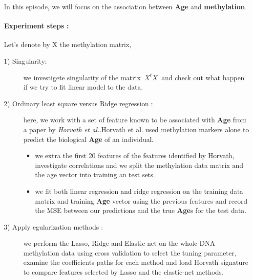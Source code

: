 \documentclass[12pt]{report}
\begin{document}
In this episode, we will focus on the association between \textbf{Age} and \textbf{methylation}.
\paragraph{Experiment steps :} Let's denote by X the methylation matrix,
\begin{description}
\item[1) Singularity:] we investigete singularity of the matrix $\ X^{t}X\ $ and check out what happen if we try to fit linear model to the data.
\item[2) Ordinary least square versus Ridge regression :] here, we work with a set of feature known to be associated with \textbf{Age} from a paper by \textit{Horvath et al.}.Horvath et al. used methylation markers alone to predict the biological \textbf{Age} of an individual.
\begin{itemize}
	\item we extra the first 20 features of the features identified by Horvath, investigate correlations and we split the methylation data matrix and the age vector into training an test sets.
	\item we fit both linear regression and ridge regression on the training data matrix and training \textbf{Age} vector using the previous features and record the MSE between our predictions and the true \textbf{Age}s for the test data.
\end{itemize}
\item[3) Apply egularization methods :] we perform the Lasso, Ridge and Elastic-net on the whole DNA methylation data using cross validation to select the tuning parameter, examine the coefficients paths for each method and load Horvath signature to compare features selected by Lasso and the elastic-net methods.
\end{description}
\end{document}
